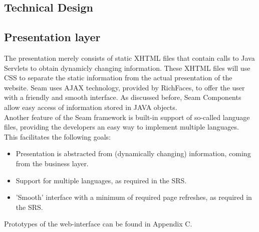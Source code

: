 \documentclass[salesmen, twoside]{../../../templates/latex/2009/softproj}
\begin{document}
\begin{projdoc}
\chapter{Technical Design \label{Technical Design}}
\section{Presentation layer}
The presentation merely consists of static XHTML files that contain calls to Java Servlets to obtain dynamicly changing information. These XHTML files will use CSS to separate the static information from the actual presentation of the website. Seam uses AJAX technology, provided by RichFaces, to offer the user with a friendly and smooth interface. As discussed before, Seam Components allow easy access of information stored in JAVA objects.\\
Another feature of the Seam framework is built-in support of so-called language files, providing the developers an easy way to implement multiple languages.\\

This facilitates the following goals:
\begin{itemize}
\item Presentation is abstracted from (dynamically changing) information, coming from the business layer.
\item Support for multiple languages, as required in the SRS.
\item 'Smooth' interface with a minimum of required page refreshes, as required in the SRS.
\end{itemize}
Prototypes of the web-interface can be found in Appendix C.


\end{projdoc}
\end{document}
